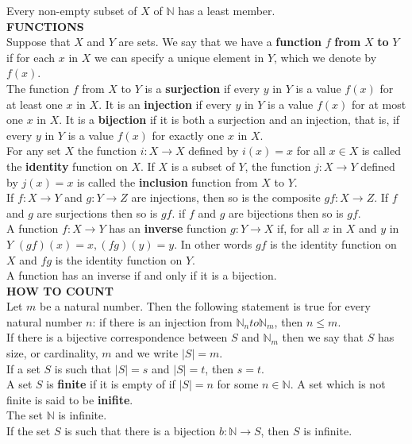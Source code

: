 \documentclass[10pt,landscape]{article}
\begin{document}
\begin{multicols}{4}
Every non-empty subset of $X$ of $\mathbb{N}$ has a least member.\\
\textbf{FUNCTIONS}\\
Suppose that $X$ and $Y$ are sets. We say that we have a \textbf{function} $f$ \textbf{from} $X$ \textbf{to} $Y$ if for each $x$ in $X$ we can specify a unique element in $Y$, which we denote by $f(x)$.\\
The function $f$ from $X$ to $Y$ is a \textbf{surjection} if every $y$ in $Y$ is a value $f(x)$ for at least one $x$ in $X$. It is an \textbf{injection} if every $y$ in $Y$ is a value $f(x)$ for at most one $x$ in $X$. It is a \textbf{bijection} if it is both a surjection and an injection, that is, if every $y$ in $Y$ is a value $f(x)$ for exactly one $x$ in $X$.\\
For any set $X$ the function $i : X \to X$ defined by $i(x) = x$ for all $x \in X$ is called the \textbf{identity} function on $X$. If $X$ is a subset of $Y$, the function $j : X \to Y$ defined by $j(x) = x$ is called the \textbf{inclusion} function from $X$ to $Y$.\\
If $f : X \to Y$ and $g : Y \to Z$ are injections, then so is the composite $gf : X \to Z$. If $f$ and $g$ are surjections then so is $gf$. if $f$ and $g$ are bijections then so is $gf$.\\
A function $f : X \to Y$ has an \textbf{inverse} function $g : Y \to X$ if, for all $x$ in $X$ and $y$ in $Y$ $(gf)(x) = x, (fg)(y) = y$. In other words $gf$ is the identity function on $X$ and $fg$ is the identity function on $Y$.\\
A function has an inverse if and only if it is a bijection.\\
\textbf{HOW TO COUNT}\\
Let $m$ be a natural number. Then the following statement is true for every natural number $n$: if there is an injection from $\mathbb{N}_n to \mathbb{N}_m$, then $n \leq m$.\\ 
If there is a bijective correspondence between $S$ and $\mathbb{N}_m$ then we say that $S$ has size, or cardinality, $m$ and we write $|S| = m$.\\
If a set $S$ is such that $|S| = s$ and $|S| = t$, then $s = t$.\\
A set $S$ is \textbf{finite} if it is empty of if $|S| = n$ for some $n \in \mathbb{N}$. A set which is not finite is said to be \textbf{inifite}.\\
The set $\mathbb{N}$ is infinite.\\
If the set $S$ is such that there is a bijection $b : \mathbb{N} \to S$, then $S$ is infinite.\\

\end{multicols}
\end{document}
